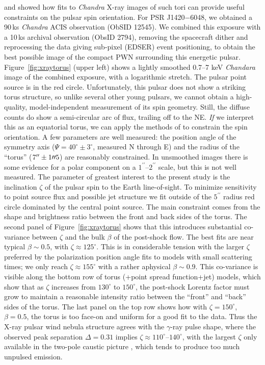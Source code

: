 \citet{ng2004fitting} and \citet{ng2008fitting} %
showed how fits to {\it Chandra} X-ray images of such tori can provide useful constraints
on the pulsar spin orientation. For PSR J1420$-$6048, we obtained a 90\,ks {\it Chandra}
ACIS observation (ObSID 12545). We combined this exposure with a 10\,ks archival observation
(ObsID 2794), removing the spacecraft dither and reprocessing the data giving
sub-pixel (EDSER) event positioning, to obtain the best possible image of the compact
PWN surrounding this energetic pulsar.  Figure~\ref{fig:xraytorus} (upper left) shows a lightly smoothed
0.7--7 keV {\it Chandara} image of the combined 
exposure, with a logarithmic stretch. The pulsar point
source is in the red circle. Unfortunately, this pulsar does not show a striking torus
structure, so unlike several other young pulsars, we cannot obtain a high-quality,
model-independent measurement of its spin geometry. Still, the diffuse counts do show
a semi-circular arc of flux, trailing off to the NE. {\it If} we interpret this as an
equatorial torus, we can apply the methods of \citet{ng2008fitting} to constrain the spin
orientation. A few parameters are well measured: the position angle of the symmetry axis
($\Psi = 40^\circ \pm 3^\circ$, measured N through E) and the radius of the ``torus''
($7^{\prime\prime}\pm 1 \hbox{$\prime\prime$} 5$) are reasonably 
constrained. In unsmoothed images there is
some evidence for a polar component on a 
$1^{\prime\prime}$--$2^{\prime\prime}$ scale, but this is not well
measured. The parameter of greatest interest to the present study is the inclination
$\zeta$ of the pulsar spin to the Earth line-of-sight.
To minimize sensitivity to point source flux and possible jet structure we fit outside
of the $5^{\prime\prime}$ radius red circle dominated by the central point source.
The main constraint comes from the shape and brightness ratio between the front and
back sides of the torus. The second panel of 
Figure~\ref{fig:xraytorus} shows that this introduces
substantial co-variance between $\zeta$ and the bulk $\beta$ of the post-shock flow.
The best fits are near typical $\beta \sim 0.5$, with $\zeta \approx 125^\circ$.
This is in considerable tension with the larger  $\zeta$ preferred by the polarization position angle
fits to models with small scattering times; 
we only reach  $\zeta \approx 155^\circ$ with a rather aphysical $\beta \sim 0.9$.
This co-variance is visible along the bottom row of torus (+point spread function+jet) models, which show that
as $\zeta$ increases from $130^\circ$ to $150^\circ$, the post-shock Lorentz factor
must grow to maintain a reasonable intensity ratio between the ``front'' and ``back''
sides of the torus. The last panel on the top row shows how with $\zeta=150^\circ$,
$\beta=0.5$, the torus is too face-on and uniform for a good fit to the data.
Thus the X-ray pulsar wind nebula structure agrees with the $\gamma$-ray pulse shape, where the observed
peak separation $\Delta = 0.31$ implies $\zeta \approx 110^\circ$--$140^\circ$, with the largest
$\zeta$ only available in the two-pole caustic picture \citep{romani2010constraining}, which tends to produce
too much unpulsed emission.

